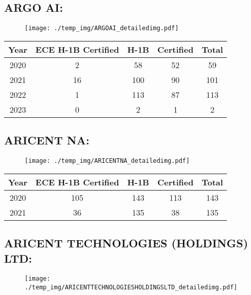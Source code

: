 \documentclass{article}%
\begin{document}
%
\newpage%
\subsection{ARGO AI:}%
\label{subsec:ARGOAI}%
\label{ARGOAIdetailed}%


\begin{figure}[htbp]%
\centering%
\texttt{[image: ./temp\_img/ARGOAI\_detailedimg.pdf]}%
\end{figure}

%
\begin{longtable}{c|c|c|c|c}%
\hline%
Year&ECE H{-}1B Certified&H{-}1B&Certified&Total\\%
\hline%
2020&2&58&52&59\\%
\hline%
2021&16&100&90&101\\%
\hline%
2022&1&113&87&113\\%
\hline%
2023&0&2&1&2\\%
\hline%
\end{longtable}

%
\newpage%
\subsection{ARICENT NA:}%
\label{subsec:ARICENTNA}%
\label{ARICENTNAdetailed}%


\begin{figure}[htbp]%
\centering%
\texttt{[image: ./temp\_img/ARICENTNA\_detailedimg.pdf]}%
\end{figure}

%
\begin{longtable}{c|c|c|c|c}%
\hline%
Year&ECE H{-}1B Certified&H{-}1B&Certified&Total\\%
\hline%
2020&105&143&113&143\\%
\hline%
2021&36&135&38&135\\%
\hline%
\end{longtable}

%
\newpage%
\subsection{ARICENT TECHNOLOGIES (HOLDINGS) LTD:}%
\label{subsec:ARICENTTECHNOLOGIES(HOLDINGS)LTD}%
\label{ARICENTTECHNOLOGIESHOLDINGSLTDdetailed}%


\begin{figure}[htbp]%
\centering%
\texttt{[image: ./temp\_img/ARICENTTECHNOLOGIESHOLDINGSLTD\_detailedimg.pdf]}%
\end{figure}
\end{document}
